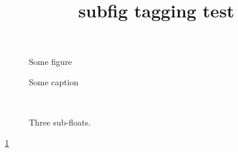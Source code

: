 \documentclass{article}
\title{subfig tagging test}
\begin{document}
\listoffigures

\begin{figure}
Some figure
\caption{Some caption}
\label{fig}
\end{figure}

\begin{figure}
\centering
{}\qquad
{}\\
\caption{Three sub-floats.}
\label{3figs}
\end{figure}

\ref{fig}

\end{document}
